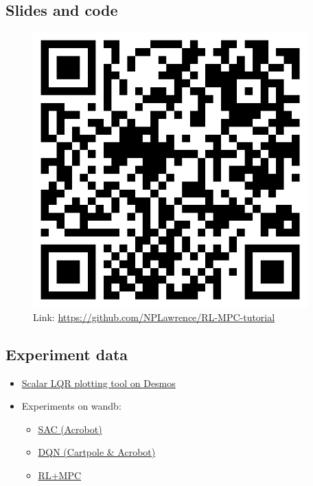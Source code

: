 \documentclass[
  letterpaper,
  DIV=11,
  numbers=noendperiod,
  oneside]{scrartcl}
\providecommand{\tightlist}{%
  \setlength{\itemsep}{0pt}\setlength{\parskip}{0pt}}\usepackage{longtable,booktabs,array}
\begin{document}
\subsection{Slides and code}\label{slides-and-code}

\begin{figure}[H]

{\centering \includegraphics[width=\textwidth,height=4.16667in]{figs/qr-github.png}

}

\caption{Link: \url{https://github.com/NPLawrence/RL-MPC-tutorial}}

\end{figure}%

\subsection{Experiment data}\label{experiment-data}

\begin{itemize}
\tightlist
\item
  \href{https://www.desmos.com/calculator/uirf3bbuu8}{Scalar LQR
  plotting tool on Desmos}
\item
  Experiments on wandb:

  \begin{itemize}
  \tightlist
  \item
    \href{https://wandb.ai/nplawrence/acrobot-upperbound}{SAC (Acrobot)}
  \item
    \href{https://wandb.ai/nplawrence/acrobot-cartpole-dqn-upperbound}{DQN
    (Cartpole \& Acrobot)}
  \item
    \href{https://wandb.ai/nplawrence/RL-MPC}{RL+MPC}
  \end{itemize}
\end{itemize}
\end{document}
